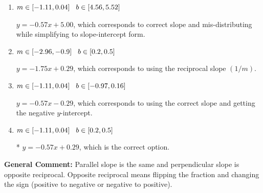 \documentclass{extbook}[14pt]
\begin{document}
\begin{enumerate}
{\begin{enumerate}[label=\Alph*.]
 $y = 0.57x + 3.71$, which corresponds to using the negative slope.
\item \( m \in [-1.11, 0.04] \hspace*{3mm} b \in [4.56, 5.52] \)

 $y = -0.57x + 5.00$, which corresponds to correct slope and mis-distributing while simplifying to slope-intercept form.
\item \( m \in [-2.96, -0.9] \hspace*{3mm} b \in [0.2, 0.5] \)

 $y = -1.75x + 0.29$, which corresponds to using the reciprocal slope $(1/m)$.
\item \( m \in [-1.11, 0.04] \hspace*{3mm} b \in [-0.97, 0.16] \)

 $y = -0.57x - 0.29$, which corresponds to using the correct slope and getting the negative $y$-intercept.
\item \( m \in [-1.11, 0.04] \hspace*{3mm} b \in [0.2, 0.5] \)

* $y = -0.57x + 0.29$, which is the correct option.
\end{enumerate}

\textbf{General Comment:} Parallel slope is the same and perpendicular slope is opposite reciprocal. Opposite reciprocal means flipping the fraction and changing the sign (positive to negative or negative to positive).
}
\end{enumerate}
\end{document}
